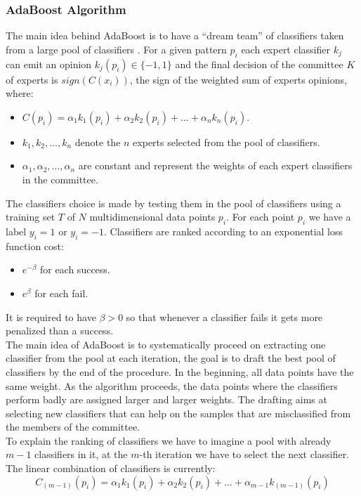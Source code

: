 \documentclass[../../Thesis.tex]{subfiles}
\begin{document}
	 		\subsubsection{AdaBoost Algorithm}
		 		The main idea behind AdaBoost is to have a “dream team” of classifiers taken from a large pool of classifiers \cite{Rojas2009}.  For a given pattern $p_i$ each expert classifier $k_j$ can emit an opinion $k_j(p_i) \in \lbrace -1, 1 \rbrace$ and the final decision of the committee $K$ of experts is $sign(C(x_i))$, the sign of the weighted sum of experts opinions, where:
		 		\begin{itemize}
		 			\item $C(p_i) = \alpha_1 k_1 (p_i) + \alpha_2 k_2 (p_i) + \dots + \alpha_n k_n (p_i)$.
		 			\item $k_1, k_2, \dots, k_n$ denote the $n$ experts selected from the pool of classifiers.
		 			\item $\alpha_1, \alpha_2, \dots, \alpha_n$ are constant and represent the weights of each expert classifiers in the committee.
		 		\end{itemize}
		 		The classifiers choice is made by testing them in the pool of classifiers using a training set $T$ of $N$ multidimensional data points $p_i$. For each point $p_i$ we have a label $y_i = 1$ or $y_i = -1$. Classifiers are ranked according to an exponential loss function cost: 
		 		\begin{itemize}
		 			\item $e^{-\beta}$ for each success.
		 			\item $e^{\beta}$ for each fail.
		 		\end{itemize}
		 		It is required to have $\beta > 0$ so that whenever a classifier fails it gets more penalized than a success.\\
		 		The main idea of AdaBoost is to systematically proceed on extracting one classifier from the pool at each iteration, the goal is to draft the best pool of classifiers by the end of the procedure. In the beginning, all data points have the same weight. As the algorithm proceeds, the data points where the classifiers perform badly are assigned larger and larger weights. The drafting aims at selecting new classifiers that can help on the samples that are misclassified from the members of the committee.\\
		 		To explain the ranking of classifiers we have to imagine a pool with already $m-1$ classifiers in it, at the $m$-th iteration we have to select the next classifier. The linear combination of classifiers is currently:
		 			\[C_{(m-1)} (p_i) = \alpha_1 k_1 (p_i) + \alpha_2 k_2 (p_i) + \dots + \alpha_{m-1} k_{(m-1)} (p_i)\]
\end{document}
